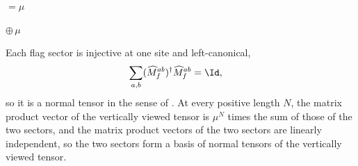\begin{lemma}
\begin{tenkzequation}
        $ = \mu$
        \begin{tenkz}[cols=1]
        \end{tenkz}
        $ \oplus\,\mu$
        \begin{tenkz}[cols=1]
        \end{tenkz}
    \end{tenkzequation}
    Each flag sector is injective at one site and left-canonical,
    \begin{align}
        \sum_{a,b}(\widehat M_f^{ab})^\dagger\widehat M_f^{ab}
         & =\Id,
        \notag
    \end{align}
    so it is a normal tensor in the sense of
    \cite[lines~231--235]{Cirac2016MPDO_arXiv}. At every positive length $N$,
    the matrix product vector of the vertically viewed tensor is
    $\mu^N$ times the sum of those of the two sectors, and the matrix product
    vectors of the two sectors are linearly independent, so the two sectors
    form a basis of normal tensors of the vertically viewed tensor.
\end{lemma}
